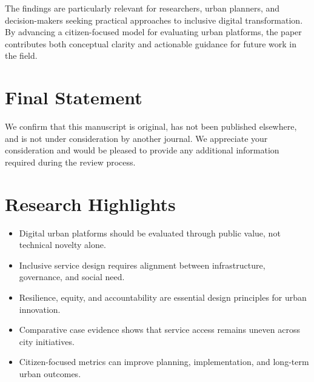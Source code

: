 \documentclass{editorialcover}
\begin{document}
The findings are particularly relevant for researchers, urban planners, and decision-makers seeking practical approaches to inclusive digital transformation. By advancing a citizen-focused model for evaluating urban platforms, the paper contributes both conceptual clarity and actionable guidance for future work in the field.

\section{Final Statement}
We confirm that this manuscript is original, has not been published elsewhere, and is not under consideration by another journal. We appreciate your consideration and would be pleased to provide any additional information required during the review process.

\section{Research Highlights}
\begin{itemize}
  \item Digital urban platforms should be evaluated through public value, not technical novelty alone.
  \item Inclusive service design requires alignment between infrastructure, governance, and social need.
  \item Resilience, equity, and accountability are essential design principles for urban innovation.
  \item Comparative case evidence shows that service access remains uneven across city initiatives.
  \item Citizen-focused metrics can improve planning, implementation, and long-term urban outcomes.
\end{itemize}
\end{document}
